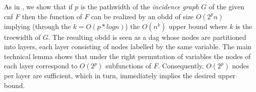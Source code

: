 \documentclass{article}
\begin{document}
As in \cite{VardiTWD}, we show that if $p$ is the pathwidth of the
\emph{incidence graph} $G$ of the given {\sc cnf} $F$ then the function of $F$
can be realized by an {\sc obdd} of size $O(2^pn)$ implying (through the $k=O(p*logn)$) the
$O(n^k)$ upper bound where $k$ is the treewidth of $G$. The resulting {\sc obdd} is seen 
as a {\sc dag} whose nodes are partitioned into layers, each layer consisting of nodes labelled
by the same variable. The main technical lemma shows that under the right permutation of variables
the nodes of each layer correspond to $O(2^p)$ subfunctions of $F$. Consequently, $O(2^p)$
nodes per layer are sufficient, which in turn, immediately implies the desired upper bound.

\begin{comment}
This upper bound is stronger than 
the one provided in \cite{VardiTWD} for the primal graph because, on the one hand, there are classes 
of {\sc cnf}s (e.g. containing one big clause) with a small treewidth of the incidence graph and 
an unbounded treewidth of the primal graph and, on the other hand, the treewidth of the incidence graph 
is at most as the treewidth of the primal graph plus one. Indeed, for each clause $C$ there 
is a bag of the tree decomposition of the primal graph 
containing all the variables of $C$. Hence, we just create a new leaf connected to the node of this bag
and put into this leaf the clause $C$ and all its variables. Due to the latter reason the lower bound
proved in the previous section holds for the parameterization by the treewidth of the incidence graph.
\end{comment}
\begin{comment}
We also show that the $O(n^k)$ upper bound cannot be extended to the case where the function to be
realized as an {\sc obdd} is represented by a circuit of width $k$ due to existence of a class of circuit
for which the equivalent {\sc obdd} is of size at least $n^{c^k}$ for some constant $1<c<2$. It is interesting
to notice that  a well-known Tseitin transformation converts the given circuit $Z$ into a {\sc cnf} $F'$ with 
at most a linear treewidth increase (see e.g. \cite{RazPet}). Consequently, $F'$
can be compiled into an {\sc obdd} of size $O(n^k)$. However, $F'$ contains variables that do not occur
in $Z$ and it is the elimination of these variables that causes the exponential gap between $O(n^k)$
and $\Omega(n^{c^k})$. The exponential explosion of the {\sc obdd} size caused by elimination of variables
has been observed earlier in \cite{VardiTWD}. However, the combination of the results of this section shows
that a more \emph{specific} elimination of variables, namely of those that are introduced by the Tseitin
transformation explodes the {\sc obdd} size as well.
\end{comment}
\end{document}
